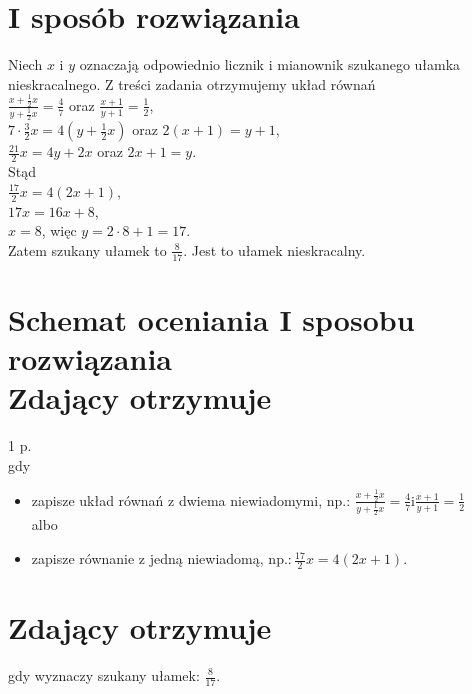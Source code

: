 \documentclass[10pt]{article}
\begin{document}
\section*{I sposób rozwiązania}
Niech $x$ i $y$ oznaczają odpowiednio licznik i mianownik szukanego ułamka nieskracalnego. Z treści zadania otrzymujemy układ równań\\
$\frac{x+\frac{1}{2} x}{y+\frac{1}{2} x}=\frac{4}{7}$ oraz $\frac{x+1}{y+1}=\frac{1}{2}$,\\
$7 \cdot \frac{3}{2} x=4\left(y+\frac{1}{2} x\right)$ oraz $2(x+1)=y+1$,\\
$\frac{21}{2} x=4 y+2 x$ oraz $2 x+1=y$.\\
Stąd\\
$\frac{17}{2} x=4(2 x+1)$,\\
$17 x=16 x+8$,\\
$x=8$, więc $y=2 \cdot 8+1=17$.\\
Zatem szukany ułamek to $\frac{8}{17}$. Jest to ułamek nieskracalny.

\section*{Schemat oceniania I sposobu rozwiązania \\
 Zdający otrzymuje}
1 p.\\
gdy

\begin{itemize}
  \item zapisze układ równań z dwiema niewiadomymi, np.: $\frac{x+\frac{1}{2} x}{y+\frac{1}{2} x}=\frac{4}{7} \mathrm{i} \frac{x+1}{y+1}=\frac{1}{2}$\\
albo
  \item zapisze równanie z jedną niewiadomą, $\mathrm{np} .: \frac{17}{2} x=4(2 x+1)$.
\end{itemize}

\section*{Zdający otrzymuje}
gdy wyznaczy szukany ułamek: $\frac{8}{17}$.
\end{document}
